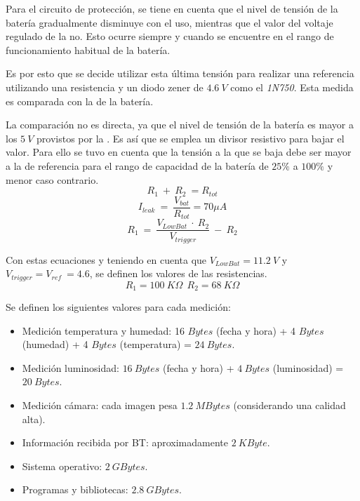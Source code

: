 Para el circuito de protección, se tiene en cuenta que el nivel de tensión de la batería gradualmente disminuye con el uso, mientras que el valor del voltaje regulado de la \rspi no. Esto ocurre siempre y cuando se encuentre en el rango de funcionamiento habitual de la batería.

Es por esto que se decide utilizar esta última tensión para realizar una referencia utilizando una resistencia y un diodo zener de $4.6 \ V$ como el \textit{1N750}. Esta medida es comparada con la de la  batería.

La comparación no es directa, ya que el nivel de tensión de la batería es mayor a los $5 \ V$ provistos por la \rspi. Es así que se emplea un divisor resistivo para bajar el valor. Para ello se tuvo en cuenta que la tensión a la que se baja debe ser mayor a la de referencia para el rango de capacidad de la batería de $25\%$ a $100\%$ y menor caso contrario.
\begin{equation}
R_1 \ +\ R_2 \ = R_{tot}
\end{equation}
\begin{equation}
I_{leak} \ = \ \frac{V_{bat}}{R_{tot}}  = 70 \mu A
\end{equation}
\begin{equation}
R_1 \ = \ \frac{V_{LowBat} \ \cdot \ R_2}{V_{trigger}} \ - \ R_2
\end{equation}

Con estas ecuaciones y teniendo en cuenta que $V_{LowBat} = 11.2 \ V$ y $V_{trigger} = V_{ref} \ = 4.6$, se definen los valores de las resistencias.
\begin{equation}
R_1 = 100 \ K\Omega  \ \ R_2 = 68 \ K\Omega
\end{equation}

Se definen los siguientes valores para cada medición:
\begin{itemize}
	\item Medición temperatura y humedad: 16 $Bytes$ (fecha y hora) + 4 $Bytes$ (humedad) + 4 $Bytes$ (temperatura) = $24 \ Bytes$.
	\item Medición luminosidad: $16 \ Bytes$ (fecha y hora) + $4 \ Bytes$ (luminosidad) = $20 \ Bytes$.
	\item Medición cámara: cada imagen pesa $1.2 \ MBytes$ \cite{ref:rpicam} (considerando una calidad alta).
	\item Información recibida por BT: aproximadamente $2 \ KByte$.
	\item Sistema operativo: $2 \ GBytes$.
	\item Programas y bibliotecas: $2.8 \ GBytes$.
\end{itemize}

